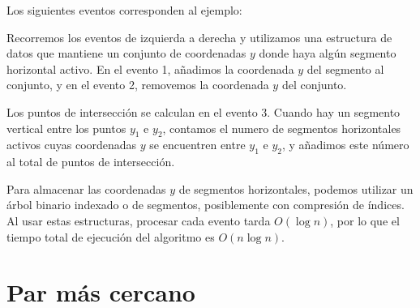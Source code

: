 Los siguientes eventos corresponden al ejemplo:
\begin{center}
\end{center}

Recorremos los eventos de izquierda a derecha y utilizamos una estructura de
datos que mantiene un conjunto de coordenadas $y$ donde haya algún segmento
horizontal activo. En el evento 1, añadimos la coordenada $y$ del segmento al
conjunto, y en el evento 2, removemos la coordenada $y$ del conjunto.

Los puntos de intersección se calculan en el evento 3. Cuando hay un segmento
vertical entre los puntos $y_1$ e $y_2$, contamos el numero de segmentos
horizontales activos cuyas coordenadas $y$ se encuentren entre $y_1$ e $y_2$,
y añadimos este número al total de puntos de intersección.

Para almacenar las coordenadas $y$ de segmentos horizontales, podemos utilizar
un árbol binario indexado o de segmentos, posiblemente con compresión de
índices. Al usar estas estructuras, procesar cada evento tarda $O(\log n)$,
por lo que el tiempo total de ejecución del algoritmo es $O(n \log n)$.

\section{Par más cercano}


